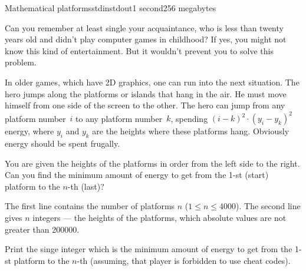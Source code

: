 \begin{problem}{Mathematical platforms}{stdin}{stdout}{1 second}{256 megabytes}

Can you remember at least single your acquaintance, who is less than twenty years old and didn’t play computer games in childhood? If yes, you might not know this kind of entertainment. But it wouldn’t prevent you to solve this problem.

In older games, which have 2D graphics, one can run into the next situation. The hero jumps along the platforms or islands that hang in the air. He must move himself from one side of the screen to the other. The hero can jump from any platform number~$i$ to any platform number~$k$, spending $(i-k)^2\cdot(y_i-y_k)^2$ energy, where $y_i$ and $y_k$ are the heights where these platforms hang. Obviously energy should be spent frugally.

You are given the heights of the platforms in order from the left side to the right. Can you find the minimum amount of energy to get from the 1-st (start) platform to the $n$-th (last)?

\InputFile
The first line contains the number of platforms $n$ ($1\leq n\leq 4000$). The second line gives $n$ integers --- the heights of the platforms, which absolute values are not greater than 200000.

\OutputFile
Print the singe integer which is the minimum amount of energy to get from the 1-st platform to the $n$-th (assuming, that player is forbidden to use cheat codes).

\Examples

\begin{example}
%
\end{example}

\end{problem}
